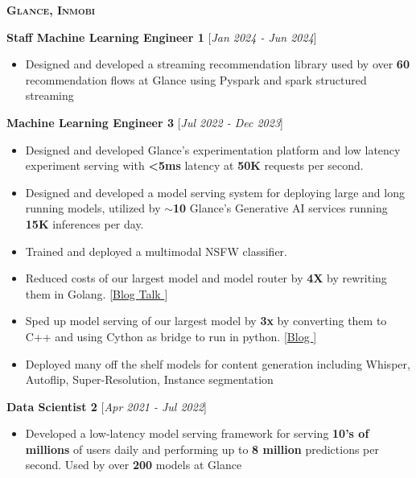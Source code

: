 \documentclass[10pt]{article}
\renewcommand{\textbf}[1]{{\bfseries\color{accent_darkest}#1}}
\newenvironment{leftindented}%
  {\list{}{\leftmargin=0.5in}\item[]}%
  {\endlist}
\begin{document}
\large\textsc{\textbf{Glance, Inmobi}}\normalsize%
\begin{leftindented}
\textbf{Staff Machine Learning Engineer 1 } \hfill \textcolor{grey_darker}{[\textit{Jan 2024 - Jun 2024}]}
\begin{itemize}
    \itemsep0em
    \item Designed and developed a streaming recommendation library used by over \textbf{60} recommendation flows at Glance using Pyspark and spark structured streaming
\end{itemize}
\textbf{Machine Learning Engineer 3 } \hfill \textcolor{grey_darker}{[\textit{Jul 2022 - Dec 2023}]}
\begin{itemize}
    \itemsep0em
    \item Designed and developed Glance's experimentation platform and low latency experiment serving with \textbf{<5ms} latency at \textbf{50K} requests per second.
    \item Designed and developed a model serving system for deploying large and long running models, utilized by $\sim$\textbf{10} Glance's Generative AI services running \textbf{15K} inferences per day.
    \item Trained and deployed a multimodal NSFW classifier.
    \item Reduced costs of our largest model and model router by \textbf{4X} by rewriting them in Golang. \quad\quad\textcolor{grey_darker}{[\href{https://ai.ragv.in/posts/golang-for-machine-learning-serving/}{Blog \textcolor{grey_dark}{\faExternalLinkSquare}} \href{https://www.youtube.com/watch?v=BkiPjUQr9yI}{Talk \textcolor{grey_dark}{\faExternalLinkSquare}}]}
    \item Sped up model serving of our largest model by \textbf{3x} by converting them to C++ and using Cython as bridge to run in python. \textcolor{grey_darker}{[\href{https://ai.ragv.in/posts/python-with-a-dash-of-cpp-optimizing/}{Blog \textcolor{grey_dark}{\faExternalLinkSquare}}]}
    \item Deployed many off the shelf models for content generation including Whisper, Autoflip, Super-Resolution, Instance segmentation
\end{itemize}
\textbf{Data Scientist 2 } \hfill \textcolor{grey_darker}{[\textit{Apr 2021 - Jul 2022}]}
\begin{itemize}
    \itemsep0em
    \item  Developed a low-latency model serving framework for serving \textbf{10's of millions} of users daily and performing up to \textbf{8 million} predictions per second. Used by over \textbf{200} models at Glance

\end{itemize}
\end{leftindented}
\end{document}
